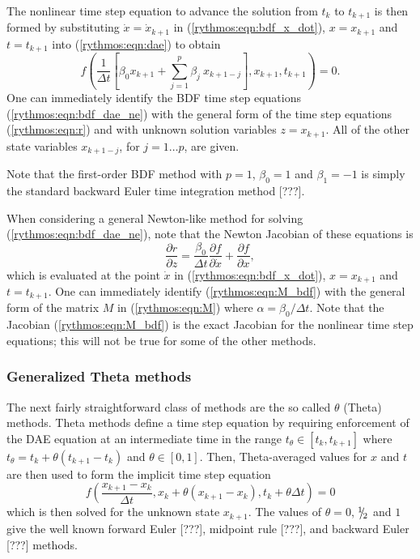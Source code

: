 \documentclass[pdf,ps2pdf,11pt]{SANDreport}
\begin{document}
The nonlinear time step equation to advance the solution from $t_k$ to
$t_{k+1}$ is then formed by substituting $\dot{x} = \dot{x}_{k+1}$ in
(\ref{rythmos:eqn:bdf_x_dot}), $x = x_{k+1}$ and $t = t_{k+1}$ into
(\ref{rythmos:eqn:dae}) to obtain
%
\begin{equation}
f\left( \frac{1}{\Delta t} \left[ \beta_0 x_{k+1} + \sum_{j=1}^{p} \beta_j \: x_{k+1-j} \right],x_{k+1},t_{k+1}\right) = 0.
\label{rythmos:eqn:bdf_dae_ne}
\end{equation}
%
One can immediately identify the BDF time step equations
(\ref{rythmos:eqn:bdf_dae_ne}) with the general form of the time step
equations (\ref{rythmos:eqn:r}) and with unknown solution variables $z =
x_{k+1}$.  All of the other state variables $x_{k+1-j}$, for $j = 1 {}\ldots
p$, are given.

Note that the first-order BDF method with $p=1$, $\beta_0 = 1$ and $\beta_1 =
-1$ is simply the standard backward Euler time integration method [???].

When considering a general Newton-like method for solving
(\ref{rythmos:eqn:bdf_dae_ne}), note that the Newton Jacobian of these
equations is
%
\begin{equation}
\frac{\partial r}{\partial z}
= \frac{\beta_0}{\Delta t} \frac{\partial f}{\partial \dot{x}} + \frac{\partial f}{\partial x},
\label{rythmos:eqn:M_bdf}
\end{equation}
%
which is evaluated at the point $\dot{x}$ in (\ref{rythmos:eqn:bdf_x_dot}), $x
= x_{k+1}$ and $t = t_{k+1}$.  One can immediately identify
(\ref{rythmos:eqn:M_bdf}) with the general form of the matrix $M$ in
(\ref{rythmos:eqn:M}) where $\alpha = \beta_0 / \Delta t$.  Note that the
Jacobian (\ref{rythmos:eqn:M_bdf}) is the exact Jacobian for the nonlinear
time step equations; this will not be true for some of the other methods.

\subsubsection{Generalized Theta methods}

The next fairly straightforward class of methods are the so called $\theta$
(Theta) methods.  Theta methods define a time step equation by requiring
enforcement of the DAE equation at an intermediate time in the range
$t_{\theta} {}\in [t_k,t_{k+1}]$ where $t_{\theta} = t_k + \theta ( t_{k+1} -
t_k )$ and $\theta {}\in [0,1]$.  Then, Theta-averaged values for $x$ and $t$
are then used to form the implicit time step equation
%
\begin{equation}
f\left( \frac{x_{k+1} - x_{k}}{\Delta t},x_k + \theta ( x_{k+1} - x_{k} ), t_k + \theta \Delta t \right) = 0
\label{rythmos:eqn:theta_dae_ne}
\end{equation}
%
which is then solved for the unknown state $x_{k+1}$.  The values of $\theta =
0$, ${}^1 \!\! / \! {}_2$ and $1$ give the well known forward Euler [???], midpoint
rule [???], and backward Euler [???] methods.
\end{document}
